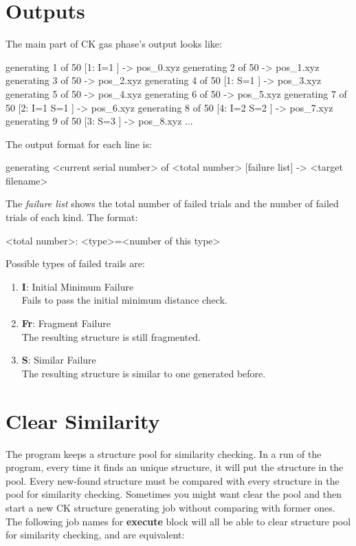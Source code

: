 \documentclass[11pt]{book}
\begin{document}
\section{Outputs}

	The main part of CK gas phase's output looks like:
\begin{everbatim}
generating 1 of 50 [1: I=1 ] -> pos_0.xyz
generating 2 of 50 -> pos_1.xyz
generating 3 of 50 -> pos_2.xyz
generating 4 of 50 [1: S=1 ] -> pos_3.xyz
generating 5 of 50 -> pos_4.xyz
generating 6 of 50 -> pos_5.xyz
generating 7 of 50 [2: I=1 S=1 ] -> pos_6.xyz
generating 8 of 50 [4: I=2 S=2 ] -> pos_7.xyz
generating 9 of 50 [3: S=3 ] -> pos_8.xyz
...
\end{everbatim}
	The output format for each line is:
\begin{everbatim}
generating <current serial number> of <total number>
    [failure list] -> <target filename>
\end{everbatim}
	The \emph{failure list} shows the total number of failed trials and the number of failed trials of each kind. The format:
\begin{everbatim}
<total number>: <type>=<number of this type>
\end{everbatim}
	Possible types of failed trails are:
	\begin{enumerate}
	\item \textbf{I}: Initial Minimum Failure \\
		Fails to pass the initial minimum distance check.
	\item \textbf{Fr}: Fragment Failure \\
		The resulting structure is still fragmented.
	\item \textbf{S}: Similar Failure \\
		The resulting structure is similar to one generated before.
	\end{enumerate}

\section{Clear Similarity}

The program keeps a structure pool for similarity checking. In a run of the program, every time it finds an unique structure, 
it will put the structure in the pool. Every new-found structure must be compared with every structure in the pool for similarity 
checking. Sometimes you might want clear the pool and then start a new CK structure generating job without comparing with former ones.
The following job names for \textbf{execute} block will all be able to clear structure pool for similarity checking, and are equivalent:
\end{document}
